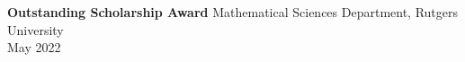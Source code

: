 \textbf{Outstanding Scholarship Award} \hfill Mathematical Sciences Department, Rutgers University\\
\hfill May 2022\\
\vspace*{2mm}


